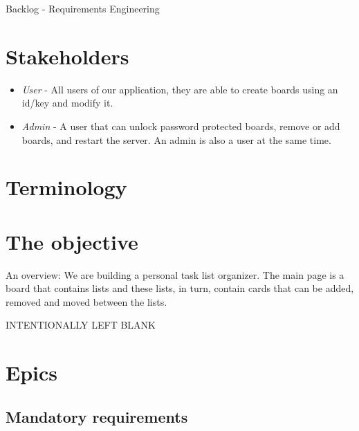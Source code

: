 \documentclass{article}
\begin{document}
	\vfill

	\begin{center}
		\Large{Backlog - Requirements Engineering}
	\end{center}

	\section{Stakeholders}

	\begin{itemize}
		\item \emph{User} - All users of our application, they are able to create boards using an id/key and modify it.
		\item \emph{Admin} - A user that can unlock password protected boards, remove or add boards, and restart the server. An admin is also a user at the same time.
	\end{itemize}

	\section{Terminology}
	\vspace{-0.5cm}
	\printglossary[title={}]

	\section{The objective}

	An overview: We are building a personal task list organizer. The main page is a board that contains lists and these lists, in turn, contain cards that can be added, removed and moved between the lists.

	\vfill
	\begin{center} \LARGE \textcolor{black!50!red!50!white}{\scshape INTENTIONALLY LEFT BLANK} \end{center}
	\vfill


	\clearpage

	\section{Epics}

	\subsection{Mandatory requirements}
\end{document}
